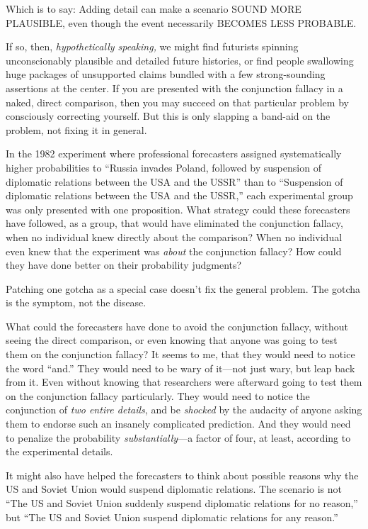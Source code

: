 {
 Which is to say: Adding detail can make a scenario SOUND MORE
PLAUSIBLE, even though the event necessarily BECOMES LESS PROBABLE.}

{
 If so, then, \textit{hypothetically speaking,} we might find
futurists spinning unconscionably plausible and detailed future
histories, or find people swallowing huge packages of unsupported
claims bundled with a few strong-sounding assertions at the center. If
you are presented with the conjunction fallacy in a naked, direct
comparison, then you may succeed on that particular problem by
consciously correcting yourself. But this is only slapping a band-aid
on the problem, not fixing it in general.}

{
 In the 1982 experiment where professional forecasters assigned
systematically higher probabilities to ``Russia
invades Poland, followed by suspension of diplomatic relations between
the USA and the USSR'' than to
``Suspension of diplomatic relations between the USA
and the USSR,'' each experimental group was only
presented with one proposition. What strategy could
these forecasters have followed, as a group, that would have eliminated
the conjunction fallacy, when no individual knew directly about the
comparison? When no individual even knew that the experiment was
\textit{about} the conjunction fallacy? How could they have done better
on their probability judgments?}

{
 Patching one gotcha as a special case doesn't fix
the general problem. The gotcha is the symptom, not the disease.}

{
 What could the forecasters have done to avoid the conjunction
fallacy, without seeing the direct comparison, or even knowing that
anyone was going to test them on the conjunction fallacy? It seems to
me, that they would need to notice the word
``and.'' They would need to be wary
of it---not just wary, but leap back from it. Even without knowing that
researchers were afterward going to test them on the conjunction
fallacy particularly. They would need to notice the conjunction of
\textit{two entire details}, and be \textit{shocked} by the audacity of
anyone asking them to endorse such an insanely complicated prediction.
And they would need to penalize the probability
\textit{substantially}{}---a factor of four, at least, according to the
experimental details.}

{
 It might also have helped the forecasters to think about possible
reasons why the US and Soviet Union would suspend diplomatic relations.
The scenario is not ``The US and Soviet Union suddenly
suspend diplomatic relations for no reason,'' but
``The US and Soviet Union suspend diplomatic relations
for any reason.''}

